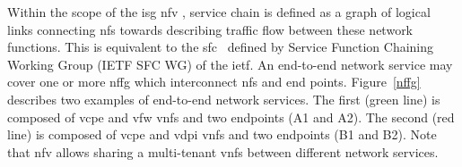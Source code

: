 Within the scope of the \gls{isg} \gls{nfv} \cite{ETSIIndustrySpecificationGroupISGNFV2014NetworkNFV}, service chain is defined as a graph of logical links connecting \glspl{nf} towards describing traffic flow between these network functions. This is equivalent to the \gls{sfc}~\cite{Halpern2015} defined by Service Function Chaining Working Group (IETF SFC WG) of the \gls{ietf}.  
An end-to-end network service may cover one or more \gls{nffg} which interconnect \glspl{nf} and end points.  Figure~\ref{nffg} describes two examples of end-to-end network services. The first (green line) is composed of \gls{vcpe} and \gls{vfw} \glspl{vnf} and two endpoints (A1 and A2). The second (red line) is composed of \gls{vcpe} and \gls{vdpi} \glspl{vnf} and two endpoints (B1 and B2). Note that \gls{nfv} allows sharing a multi-tenant \glspl{vnf} between different network services. 

